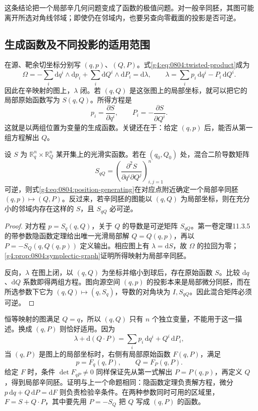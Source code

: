 这条结论把一个局部辛几何问题变成了函数的极值问题。对一般辛同胚，其图可能离开所选对角线邻域；即使仍在邻域内，也要另查向零截面的投影是否可逆。

\subsection{生成函数及不同投影的适用范围}
\label{g4:subsec:0804:03}

在源、靶余切坐标分别写 \((q,p)\)、\((Q,P)\)。式\eqref{g4:eq:0804:twisted-product}成为
\[
	\Omega=-\sum_i\mathrm{d}q^i\wedge\mathrm{d}p_i
	+\sum_i\mathrm{d}Q^i\wedge\mathrm{d}P_i
	=\mathrm{d}\lambda,
	\qquad \lambda=\sum_i p_i\,\mathrm{d}q^i-P_i\,\mathrm{d}Q^i.
\]
因此在辛映射的图上，\(\lambda\) 闭。若 \((q,Q)\) 是这张图上的局部坐标，就可以把它的局部原始函数写为 \(S(q,Q)\)。所得方程是
\begin{equation}\label{g4:eq:0804:position-generating}
	p_i=\frac{\partial S}{\partial q^i},
	\qquad P_i=-\frac{\partial S}{\partial Q^i}.
\end{equation}
这就是以两组位置为变量的生成函数。关键还在于：给定 \((q,p)\) 后，能否从第一组方程解出 \(Q\)。\cite[第2.5节，第99--100页]{Cannas2006Symplectic}

\begin{proposition}\label{g4:prop:0804:generating-function}
	设 \(S\) 为 \(\mathbb R_q^n\times\mathbb R_Q^n\) 某开集上的光滑实函数。若在 \((q_0,Q_0)\) 处，混合二阶导数矩阵
	\[
		S_{qQ}=\left(\frac{\partial^2S}{\partial q^i\partial Q^j}\right)_{i,j=1}^n
	\]
	可逆，则式\eqref{g4:eq:0804:position-generating}在对应点附近确定一个局部辛同胚 \((q,p)\mapsto(Q,P)\)。反过来，若辛同胚的图能以 \((q,Q)\) 为局部坐标，则在充分小的邻域内存在这样的 \(S\)，且 \(S_{qQ}\) 必可逆。
\end{proposition}
\begin{proof}
	对方程 \(p=S_q(q,Q)\)，关于 \(Q\) 的导数是可逆矩阵 \(S_{qQ}\)。第一卷定理11.3.5的带参数隐函数定理给出唯一光滑局部解 \(Q=Q(q,p)\)，再以 \(P=-S_Q(q,Q(q,p))\) 定义输出。相应图上有 \(\lambda=\mathrm{d}S\)，故 \(\Omega\) 的拉回为零；\cref{g4:prop:0804:symplectic-graph}证明所得映射为局部辛同胚。

	反向，\(\lambda\) 在图上闭，以 \((q,Q)\) 为坐标并缩小到球后，存在原始函数 \(S\)。比较 \(\mathrm{d}q\)、\(\mathrm{d}Q\) 系数即得两组方程。图向源空间 \((q,p)\) 的投影本来是局部微分同胚，而在所选参数下它为 \((q,Q)\mapsto(q,S_q)\)，导数的对角块为 \(I,S_{qQ}\)。因此混合矩阵必须可逆。
\end{proof}

恒等映射的图满足 \(Q=q\)，所以 \((q,Q)\) 只有 \(n\) 个独立变量，不能用于这一描述。换成 \((q,P)\) 则恰好适用。因为
\[
	\lambda+\mathrm{d}(Q\cdot P)
	=\sum_i p_i\,\mathrm{d}q^i+Q^i\,\mathrm{d}P_i,
\]
当 \((q,P)\) 是图上的局部坐标时，右侧有局部原始函数 \(F(q,P)\)，满足
\begin{equation}\label{g4:eq:0804:mixed-generating}
	p=F_q(q,P),\qquad Q=F_P(q,P).
\end{equation}
给定 \(F\) 时，条件 \(\det F_{qP}\ne0\) 同样保证先从第一式解出 \(P=P(q,p)\)，再定义 \(Q\)，得到局部辛同胚。证明与上一个命题相同：隐函数定理负责解方程，微分 \(p\,\mathrm{d}q+Q\,\mathrm{d}P=\mathrm{d}F\) 则负责检验辛条件。在两种参数同时可用的区域里，\(F=S+Q\cdot P\)，其中要先用 \(P=-S_Q\) 把 \(Q\) 写成 \((q,P)\) 的函数。

